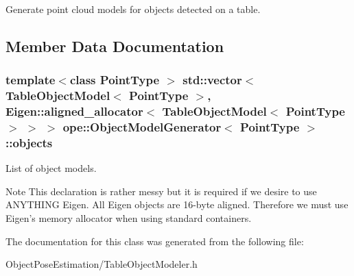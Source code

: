 Generate point cloud models for objects detected on a table. 

\subsection{Member Data Documentation}
\hypertarget{classope_1_1_object_model_generator_acfe3286278478e32bb2a4e7880f777b9}{
\subsubsection[{objects}]{\setlength{\rightskip}{0pt plus 5cm}template$<$class Point\-Type $>$ std\-::vector$<$ {\bf Table\-Object\-Model}$<$ Point\-Type $>$, Eigen\-::aligned\-\_\-allocator$<$ {\bf Table\-Object\-Model}$<$ Point\-Type $>$ $>$ $>$ {\bf ope\-::\-Object\-Model\-Generator}$<$ Point\-Type $>$\-::objects}}\label{classope_1_1_object_model_generator_acfe3286278478e32bb2a4e7880f777b9}


List of object models. 

\begin{DoxyNote}{Note}
This declaration is rather messy but it is required if we desire to use A\-N\-Y\-T\-H\-I\-N\-G Eigen. All Eigen objects are 16-\/byte aligned. Therefore we must use Eigen's memory allocator when using standard containers. 
\end{DoxyNote}


The documentation for this class was generated from the following file\-:\begin{DoxyCompactItemize}
\item 
Object\-Pose\-Estimation/Table\-Object\-Modeler.\-h\end{DoxyCompactItemize}
